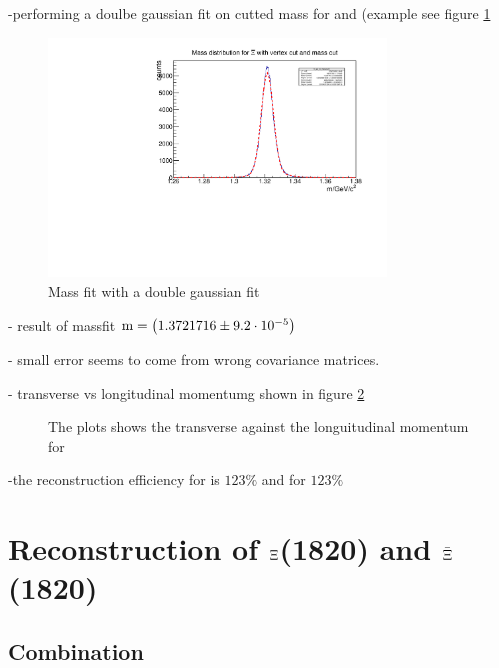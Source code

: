		-performing a doulbe gaussian fit on cutted mass for \anticascade and \cascade (example see figure \ref{fig:XiPlus_massfit}
		
		\begin{figure}
			\centering
				\includegraphics[width=0.8\textwidth]{./plots/Xi/XiPlus_m_masscut.pdf}
			\caption{Mass fit with a double gaussian fit}
			\label{fig:XiPlus_massfit}
		\end{figure}
		
		- result of massfit $\textnormal{m} = \left( 1.3721716 \pm 9.2\cdot 10^{-5}\right)$ \massunit
		
		- small error seems to come from wrong covariance matrices.
		
		- transverse vs longitudinal momentumg shown in figure \ref{fig:Xi_pt_vs_pz}
		
		\begin{figure}
			
			\centering
			\caption{The plots shows the transverse against the longuitudinal momentum for \anticascade}
			\label{fig:Xi_pt_vs_pz}
		
		\end{figure}
		
		-the reconstruction efficiency for \anticascade is $123\%$ and for \cascade $123\%$
		
	
	
	

\section{Reconstruction of $\boldmath{\Xi}$(1820) and $\boldmath{\bar{\Xi}}$(1820)}
		\subsection{Combination}

